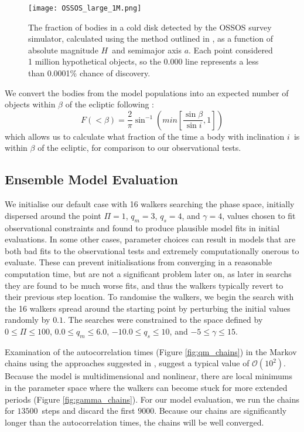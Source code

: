 \documentclass[printer]{aa}
\begin{document}
\begin{figure}
  \texttt{[image: OSSOS\_large\_1M.png]}
  \caption{The fraction of bodies in a cold disk detected by the OSSOS survey simulator, calculated using the method outlined in \citet{2018FrASS...5...14L}, as a function of absolute magnitude $H$~and semimajor axis $a$.  Each point considered 1 million hypothetical objects, so the 0.000 line represents a less than 0.0001\% chance of discovery.}
  \label{fig:OSSOS}
\end{figure}

We convert the bodies from the model populations into an expected number of objects within $\beta$ of the ecliptic following \citet{2014ApJ...782..100F}:
\begin{equation}
    F(<\beta) = \frac{2}{\pi} \sin^{-1}{\left(min\left[\frac{\sin{\beta}}{\sin{i}}, 1\right]\right)}
\end{equation}
which allows us to calculate what fraction of the time a body with inclination $i$~is within $\beta$ of the ecliptic, for comparison to our observational tests.

%
\subsection{Ensemble Model Evaluation}

We initialise our default case with 16 walkers searching the phase space, initially dispersed around the point $\Pi = 1$, $q_m = 3$, $q_s = 4$, and $\gamma = 4$, values chosen to fit observational constraints and found to produce plausible model fits in initial evaluations.  In some other cases, parameter choices can result in models that are both bad fits to the observational tests and extremely computationally onerous to evaluate.  These can prevent initialisations from converging in a reasonable computation time, but are not a significant problem later on, as later in searchs they are found to be much worse fits, and thus the walkers typically revert to their previous step location.  To randomise the walkers, we begin the search with the 16 walkers spread around the starting point by perturbing the initial values randomly by $0.1$.  The searches were constrained to the space defined by $0 \leq \Pi \leq 100$, $0.0 \leq q_m \leq 6.0$, $-10.0 \leq q_s \leq 10$, and $-5 \leq \gamma \leq 15$.

Examination of the autocorrelation times (Figure \ref{fig:qm_chains}) in the Markov chains using the approaches suggested in \citet{2013PASP..125..306F}, suggest a typical value of $\mathcal{O}\left(10^2\right)$.  Because the model is multidimensional and nonlinear, there are local minimums in the parameter space where the walkers can become stuck for more extended periods (Figure \ref{fig:gamma_chains}).  For our model evaluation, we run the chains for $13500$~steps and discard the first $9000$.  Because our chains are significantly longer than the autocorrelation times, the chains will be well converged.
\end{document}
